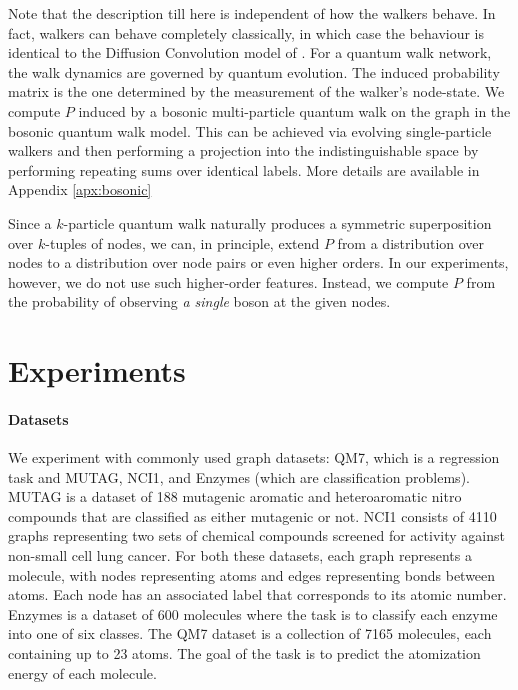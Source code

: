 \documentclass{article}
\begin{document}
Note that the description till here is independent of how the walkers behave. In fact, walkers can behave completely classically, in which case the behaviour is identical to the Diffusion Convolution model of \citet{Atwood2016DiffusionConvolutionalNN}. For a quantum walk network, the walk dynamics are governed by quantum evolution. The induced probability matrix is the one determined by the measurement of the walker's node-state. We compute $ P $ induced by a bosonic multi-particle quantum walk on the graph in the bosonic quantum walk model. This can be achieved via evolving single-particle walkers and then performing a projection into the indistinguishable space by performing repeating sums over identical labels. More details are available in Appendix \ref{apx:bosonic} 

Since a $k$-particle quantum walk naturally produces a symmetric superposition over $k$-tuples of nodes, we can, in principle, extend $P$ from a distribution over nodes to a distribution over node pairs or even higher orders. In our experiments, however, we do not use such higher-order features. Instead, we compute $P$ from the probability of observing \emph{a single} boson at the given nodes.


\section{Experiments}
\label{sec:exp}
\paragraph{Datasets}
We experiment with commonly used graph datasets: QM7, which is a regression task and  MUTAG, NCI1, and Enzymes (which are classification problems). MUTAG \cite{denath_mutag} is a dataset of 188 mutagenic aromatic and heteroaromatic nitro compounds that are classified as either mutagenic or not. NCI1 \cite{wale_nci1} consists of 4110 graphs representing two sets of chemical compounds screened for activity against non-small cell lung cancer. For both these datasets, each graph represents a molecule, with nodes representing atoms and edges representing bonds between atoms. Each node has an associated label that corresponds to its atomic number. Enzymes \cite{borgwardt2005protein} is a dataset of 600 molecules where the task is to classify each enzyme into one of six classes.
The QM7 dataset \cite{PhysRevLett.108.058301,blum09} is a collection of 7165 molecules, each containing up to 23 atoms. The goal of the task is to predict the atomization energy of each molecule.
\end{document}
